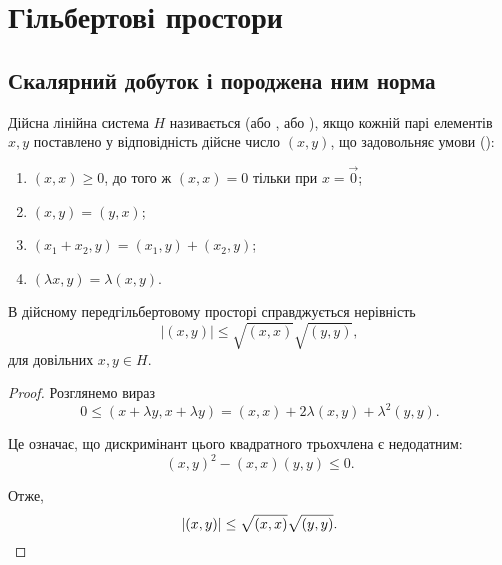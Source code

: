 \chapter{Гільбертові простори}

\section{Скалярний добуток і породжена ним норма}

\begin{definition}
Дійсна лінійна система $H$ називається
 (або ,
або ), якщо кожній парі елементів $x, y$
поставлено у відповідність дійсне число $(x, y)$, що
задовольняє умови ():
\begin{enumerate}
\item $(x, x) \ge 0$, до того ж $(x, x) = 0$ тільки при $x = \vec 0$;
\item $(x, y) = (y, x)$;
\item $(x_1 + x_2, y) = (x_1, y) + (x_2, y)$;
\item $(\lambda x, y) = \lambda (x, y)$.
\end{enumerate}
\end{definition}

\begin{lemma}
В дійсному передгільбертовому просторі справджується нерівність
\begin{equation*}
|(x, y)| \le \sqrt{(x, x)} \sqrt{(y, y)},
\end{equation*}
для довільних $x, y \in H$.
\end{lemma}

\begin{proof}
Розглянемо вираз
\begin{equation*}
    0 \le (x + \lambda y, x + \lambda y) = (x, x) + 2 \lambda (x, y) + \lambda^2 (y, y).
\end{equation*}

Це означає, що дискримінант цього квадратного трьохчлена
є недодатним:
\begin{equation*}
    (x, y)^2 - (x, x) (y, y) \le 0.
\end{equation*}

Отже,
\begin{equation*}
|(x, y)| \le \sqrt{(x, x)} \sqrt{(y, y)}. \qedhere
\end{equation*}
\end{proof}

